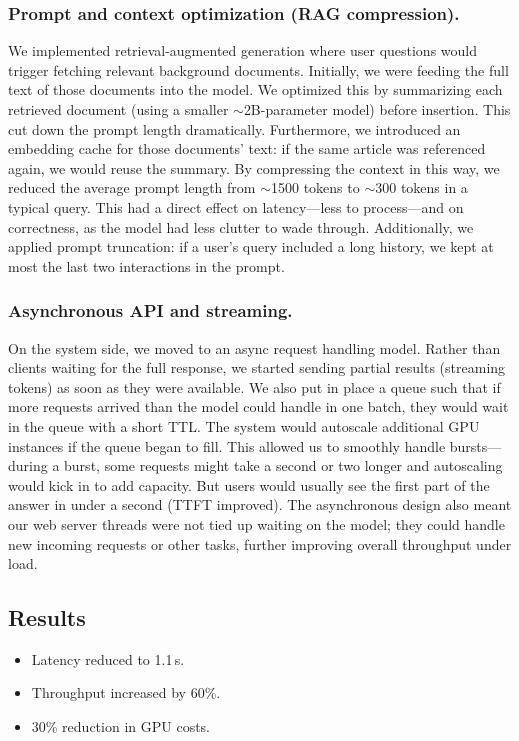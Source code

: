 \subsubsection{Prompt and context optimization (RAG compression).}
We implemented retrieval-augmented generation where user questions would trigger fetching relevant background documents. Initially, we were feeding the full text of those documents into the model. We optimized this by summarizing each retrieved document (using a smaller $\sim$2B-parameter model) before insertion. This cut down the prompt length dramatically. Furthermore, we introduced an embedding cache for those documents’ text: if the same article was referenced again, we would reuse the summary. By compressing the context in this way, we reduced the average prompt length from $\sim$1500 tokens to $\sim$300 tokens in a typical query. This had a direct effect on latency---less to process---and on correctness, as the model had less clutter to wade through. Additionally, we applied prompt truncation: if a user’s query included a long history, we kept at most the last two interactions in the prompt.

\subsubsection{Asynchronous API and streaming.}
On the system side, we moved to an async request handling model. Rather than clients waiting for the full response, we started sending partial results (streaming tokens) as soon as they were available. We also put in place a queue such that if more requests arrived than the model could handle in one batch, they would wait in the queue with a short TTL. The system would autoscale additional GPU instances if the queue began to fill. This allowed us to smoothly handle bursts---during a burst, some requests might take a second or two longer and autoscaling would kick in to add capacity. But users would usually see the first part of the answer in under a second (TTFT improved). The asynchronous design also meant our web server threads were not tied up waiting on the model; they could handle new incoming requests or other tasks, further improving overall throughput under load.

\subsection{Results}
\begin{itemize}
    \item Latency reduced to 1.1\,s.
    \item Throughput increased by 60\%.
    \item 30\% reduction in GPU costs.
\end{itemize}

